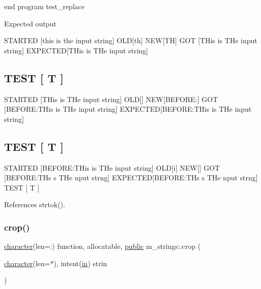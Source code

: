 end program test\+\_\+replace

Expected output 

 S\+T\+A\+R\+T\+ED \mbox{[}this is the input string\mbox{]} O\+LD\mbox{[}th\mbox{]} N\+EW\mbox{[}TH\mbox{]} G\+OT \mbox{[}T\+His is T\+He input string\mbox{]} E\+X\+P\+E\+C\+T\+ED\mbox{[}T\+His is T\+He input string\mbox{]} \subsection*{T\+E\+ST \mbox{[} T \mbox{]} }

S\+T\+A\+R\+T\+ED \mbox{[}T\+His is T\+He input string\mbox{]} O\+LD\mbox{[}\mbox{]} N\+EW\mbox{[}B\+E\+F\+O\+RE\+:\mbox{]} G\+OT \mbox{[}B\+E\+F\+O\+RE\+:T\+His is T\+He input string\mbox{]} E\+X\+P\+E\+C\+T\+ED\mbox{[}B\+E\+F\+O\+RE\+:T\+His is T\+He input string\mbox{]} \subsection*{T\+E\+ST \mbox{[} T \mbox{]} }

S\+T\+A\+R\+T\+ED \mbox{[}B\+E\+F\+O\+RE\+:T\+His is T\+He input string\mbox{]} O\+LD\mbox{[}i\mbox{]} N\+EW\mbox{[}\mbox{]} G\+OT \mbox{[}B\+E\+F\+O\+RE\+:T\+Hs s T\+He nput strng\mbox{]} E\+X\+P\+E\+C\+T\+ED\mbox{[}B\+E\+F\+O\+RE\+:T\+Hs s T\+He nput strng\mbox{]} T\+E\+ST \mbox{[} T \mbox{]} 

References strtok().

\mbox{\label{namespacem__strings_a7030d33ae9e65d8cf2e2cb9332ffdac0}} 
\subsubsection{\texorpdfstring{crop()}{crop()}}
{\footnotesize\ttfamily \hyperlink{option__stopwatch_83_8txt_abd4b21fbbd175834027b5224bfe97e66}{character}(len=\+:) function, allocatable, \hyperlink{M__stopwatch_83_8txt_a2f74811300c361e53b430611a7d1769f}{public} m\+\_\+strings\+::crop (\begin{DoxyParamCaption}\item[{\hyperlink{option__stopwatch_83_8txt_abd4b21fbbd175834027b5224bfe97e66}{character}(len=$\ast$), intent(\hyperlink{M__journal_83_8txt_afce72651d1eed785a2132bee863b2f38}{in})}]{strin }\end{DoxyParamCaption})}



